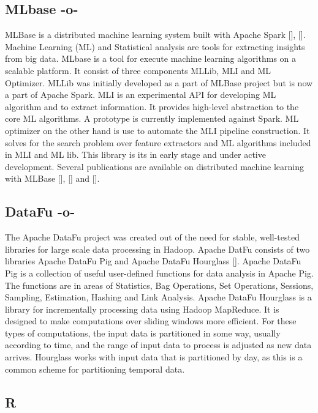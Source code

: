 \subsection{MLbase -o-}
    
MLBase is a distributed machine learning system built with Apache
Spark [\cite{www-spark}], [\cite{www-mlbase}].  Machine Learning (ML) and
Statistical analysis are tools for extracting insights from big data.
MLbase is a tool for execute machine learning algorithms on a scalable
platform. It consist of three components MLLib, MLI and ML
Optimizer. MLLib was initially developed as a part of MLBase project
but is now a part of Apache Spark. MLI is an experimental API for
developing ML algorithm and to extract information. It provides
high-level abstraction to the core ML algorithms. A prototype is
currently implemented against Spark. ML optimizer on the other hand is
use to automate the MLI pipeline construction. It solves for the
search problem over feature extractors and ML algorithms included in
MLI and ML lib. This library is its in early stage and under active
development. Several publications are available on distributed machine
learning with MLBase [\cite{mlbasepub1}], [\cite{mlbasepub2}]
and [\cite{mlbasepub3}].




\subsection{DataFu -o-}

The Apache DataFu project was created out of the need for stable,
well-tested libraries for large scale data processing in Hadoop.
Apache DatFu consists of two libraries Apache DataFu Pig and Apache
DataFu Hourglass [\cite{www-DataFu}]. Apache DataFu Pig is a collection
of useful user-defined functions for data analysis in Apache Pig. The
functions are in areas of Statistics, Bag Operations, Set Operations,
Sessions, Sampling, Estimation, Hashing and Link Analysis.  Apache
DataFu Hourglass is a library for incrementally processing data using
Hadoop MapReduce. It is designed to make computations over sliding
windows more efficient. For these types of computations, the input
data is partitioned in some way, usually according to time, and the
range of input data to process is adjusted as new data arrives.
Hourglass works with input data that is partitioned by day, as this is
a common scheme for partitioning temporal data.



\subsection{R}

